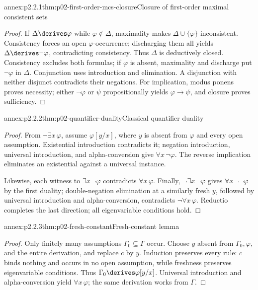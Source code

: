 
\begin{annexitem}{annex:p2.2.1}{thm:p02-first-order-mcs-closure}{Closure of first-order maximal consistent sets}
\begin{proof}
If \(\Delta\derives\varphi\) while \(\varphi\notin\Delta\), maximality
makes \(\Delta\cup\{\varphi\}\) inconsistent.  Consistency forces an open
\(\varphi\)-occurrence; discharging them all yields
\(\Delta\derives\neg\varphi\), contradicting consistency.
Thus \(\Delta\) is deductively closed.  Consistency excludes both formulas;
if \(\varphi\) is absent, maximality and discharge put \(\neg\varphi\) in
\(\Delta\).
Conjunction uses introduction and elimination.  A disjunction with neither
disjunct contradicts their negations.  For implication, modus ponens proves
necessity; either \(\neg\varphi\) or \(\psi\) propositionally yields
\(\varphi\to\psi\), and closure proves sufficiency.
\end{proof}
\end{annexitem}

\begin{annexitem}{annex:p2.2.2}{thm:p02-quantifier-duality}{Classical quantifier duality}
\begin{proof}
From \(\neg\exists x\,\varphi\), assume \(\varphi[y/x]\), where \(y\) is
absent from \(\varphi\) and every open assumption.  Existential introduction
contradicts it; negation introduction, universal
introduction, and alpha-conversion give \(\forall x\,\neg\varphi\).  The
reverse implication eliminates an existential against a universal instance.

Likewise, each witness to \(\exists x\,\neg\varphi\) contradicts
\(\forall x\,\varphi\).  Finally, \(\neg\exists x\,\neg\varphi\) gives
\(\forall x\,\neg\neg\varphi\) by the first duality; double-negation
elimination at a similarly fresh \(y\), followed by universal introduction
and alpha-conversion, contradicts \(\neg\forall x\,\varphi\).  Reductio
completes the last direction; all eigenvariable conditions hold.
\end{proof}
\end{annexitem}

\begin{annexitem}{annex:p2.2.3}{thm:p02-fresh-constant}{Fresh-constant lemma}
\begin{proof}
Only finitely many assumptions \(\Gamma_0\subseteq\Gamma\) occur.  Choose
\(y\) absent from \(\Gamma_0,\varphi\), and the entire derivation, and replace
\(c\) by \(y\).  Induction preserves every rule: \(c\) binds nothing and
occurs in no open assumption, while freshness preserves eigenvariable
conditions.  Thus \(\Gamma_0\derives\varphi[y/x]\).  Universal introduction
and alpha-conversion yield \(\forall x\,\varphi\); the same derivation works
from \(\Gamma\).
\end{proof}
\end{annexitem}

